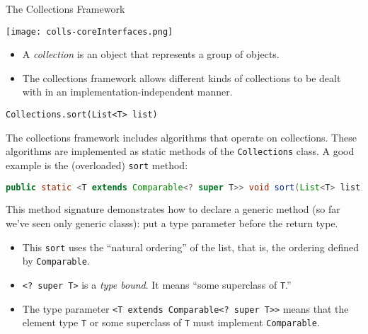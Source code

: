 \documentclass{beamer}
\author[Chris Simpkins]
{Christopher Simpkins \\\texttt{chris.simpkins@gatech.edu}}
\institute[Georgia Tech] %
\date[CS 1331]{}
\begin{document}
\begin{frame}
  \titlepage
\end{frame}


\begin{frame}[fragile]{The Collections Framework}

\begin{center}
\texttt{[image: colls-coreInterfaces.png]}
\end{center}

\begin{itemize}
\item A {\it collection} is an object that represents a group of objects.
\item The collections framework allows different kinds of collections to be dealt with in an implementation-independent manner.
\end{itemize}


\end{frame}

\begin{frame}[fragile]{{\tt Collections.sort(List<T> list)}}


The collections framework includes algorithms that operate on collections.  These algorithms are implemented as static methods of the {\tt Collections} class.  A good example is the (overloaded) {\tt sort} method:
\begin{lstlisting}[language=Java]
public static <T extends Comparable<? super T>> void sort(List<T> list)
\end{lstlisting}
This method signature demonstrates how to declare a generic method (so far we've seen only generic classs): put a type parameter before the return type.
\begin{itemize}
\item This {\tt sort} uses the ``natural ordering'' of the list, that is, the ordering defined by {\tt Comparable}.
\item {\tt <? super T>} is a {\it type bound}.  It means ``some superclass of {\tt T}.''
\item The type parameter {\tt <T extends Comparable<? super T>>} means that the element type {\tt T} or some superclass of {\tt T} must implement {\tt Comparable}.
\end{itemize}


\end{frame}
\end{document}
